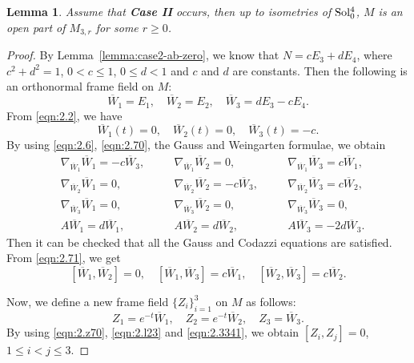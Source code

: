 \documentclass[reqno]{amsart}%
\newtheorem{lemma}[theorem]{Lemma}
\theoremstyle{definition}
\numberwithin{equation}{section}
\begin{document}
	\begin{lemma}
		\label{lemma:case2-immersion}
		Assume that {\bf Case II} occurs, then up to isometries of ${\rm Sol_0^4}$,
		$M$ is an open part of $M_{3,r}$ for some $r\geq0$.
	\end{lemma}
	\begin{proof}
		By Lemma~\ref{lemma:case2-ab-zero}, we know that $N=cE_3+dE_4$, where $c^2+d^2=1$, $0<c\leq 1$,
		$0\leq d<1$ and $c$ and $d$ are constants. 
		Then the following is an orthonormal frame field on $M$:
		\begin{equation}\label{eqn:2.70}
			\overline{W}_1=E_1, \quad \overline{W}_2=E_2, \quad \overline{W}_3=dE_3-cE_4.
		\end{equation}
		From \eqref{eqn:2.2}, we have
		\begin{equation}\label{eqn:2.z70}
			\overline{W}_1(t)=0, \quad \overline{W}_2(t)=0, \quad \overline{W}_3(t)=-c.
		\end{equation}
		By using \eqref{eqn:2.6}, \eqref{eqn:2.70}, the Gauss and Weingarten formulae,
		we obtain
		\begin{equation}\label{eqn:2.71}
			\begin{alignedat}{3}
				&\nabla_{\overline{W}_1}\overline{W}_1=-c\overline{W}_3, \quad
				&&\nabla_{\overline{W}_1}\overline{W}_2=0, \quad
				&&\nabla_{\overline{W}_1}\overline{W}_3=c\overline{W}_1,\\
				&\nabla_{\overline{W}_2}\overline{W}_1=0, \quad
				&&\nabla_{\overline{W}_2}\overline{W}_2=-c\overline{W}_3, \quad
				&&\nabla_{\overline{W}_2}\overline{W}_3=c\overline{W}_2,\\
				&\nabla_{\overline{W}_3}\overline{W}_1=0, \quad
				&&\nabla_{\overline{W}_3}\overline{W}_2=0, \quad
				&&\nabla_{\overline{W}_3}\overline{W}_3=0,\\
				&A\overline{W}_1=d\overline{W}_1, \quad 
				&&A\overline{W}_2=d\overline{W}_2, \quad
				&&A\overline{W}_3=-2d\overline{W}_3.
			\end{alignedat}
		\end{equation}
		Then it can be checked that all the Gauss and Codazzi equations are satisfied.
		From \eqref{eqn:2.71}, we get
		\begin{equation}\label{eqn:2.l23}
			[\overline{W}_1,\overline{W}_2]=0, \quad [\overline{W}_1,\overline{W}_3]=c\overline{W}_1, \quad [\overline{W}_2,\overline{W}_3]=c\overline{W}_2.
		\end{equation}
		
		Now, we define a new frame field $\{Z_i\}_{i=1}^3$ on $M$ as follows:
		\begin{equation}\label{eqn:2.3341}
			Z_1=e^{-t}\overline{W}_1, \quad Z_2=e^{-t}\overline{W}_2, \quad Z_3=\overline{W}_3.
		\end{equation}
		By using \eqref{eqn:2.z70}, \eqref{eqn:2.l23} and \eqref{eqn:2.3341},
		we obtain $[Z_i,Z_j]=0$, $1\leq i<j\leq3$.
		

\end{proof}
\end{document}
